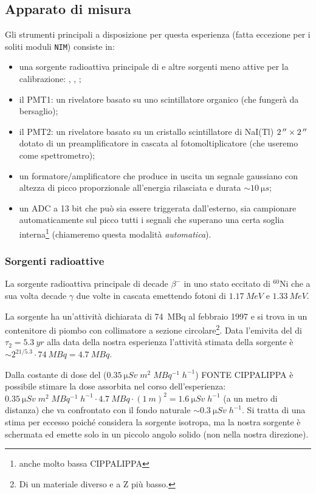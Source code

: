 \subsection{Apparato di misura}
Gli strumenti principali a disposizione per questa esperienza (fatta eccezione per i soliti moduli \texttt{NIM}) consiste in:
\begin{itemize}
	\item una sorgente radioattiva principale di \co\! e altre sorgenti meno attive per la calibrazione: \cs, \na, \am;
	\item il PMT1: un rivelatore basato su uno scintillatore organico (che fungerà da bersaglio);
	\item il PMT2: un rivelatore basato su un cristallo scintillatore di NaI(Tl) $\SI2{''}\times\SI2{''}$ dotato di un preamplificatore in cascata al fotomoltiplicatore (che useremo come spettrometro);
	\item un formatore/amplificatore che produce in uscita un segnale gaussiano con altezza di picco proporzionale all'energia rilasciata e durata $\sim \SI{10}{\micro s}$;
	\item un ADC a 13 bit che può sia essere triggerata dall'esterno, sia campionare automaticamente sul picco tutti i segnali che superano una certa soglia interna\footnote{anche molto bassa CIPPALIPPA} (chiameremo questa modalità \emph{automatica}).
\end{itemize}

\subsubsection{Sorgenti radioattive}
La sorgente radioattiva principale di \co\; decade $\beta^-$ in uno stato eccitato di $^{60}$Ni che a sua volta decade $\gamma$ due volte in cascata emettendo fotoni di $\SI{1.17}{MeV}$ e $\SI{1.33}{MeV}$.

La sorgente ha un'attività dichiarata di \SI{74}{MBq} al febbraio 1997 e si trova in un contenitore di piombo con collimatore a sezione circolare\footnote{Di un materiale diverso e a Z più basso.}. 
Data l'emivita del \co\; di $\tau_2 = \SI{5.3}{yr}$ alla data della nostra esperienza l'attività stimata della sorgente è $\sim 2^{21/5.3} \cdot \SI{74}{MBq} = \SI{4.7}{MBq}$.

Dalla costante di dose del \co\;  ($\SI{0.35}{\micro Sv\;m^2\;MBq^{-1}\;h^{-1}}$) FONTE CIPPALIPPA è possibile stimare la dose assorbita nel corso dell'esperienza: $\SI{0.35}{\micro Sv\;m^2\;MBq^{-1}\;h^{-1}} \cdot \SI{4.7}{MBq} \cdot (\SI{1}{m})^2= \SI{1.6}{\micro Sv\;h^{-1}}$ (a un metro di distanza) che va confrontato con il fondo naturale $\sim\SI{0.3}{\micro Sv\;h^{-1}}$. Si tratta di una stima per eccesso poiché considera la sorgente isotropa, ma la nostra sorgente è schermata ed emette solo in un piccolo angolo solido (non nella nostra direzione).

